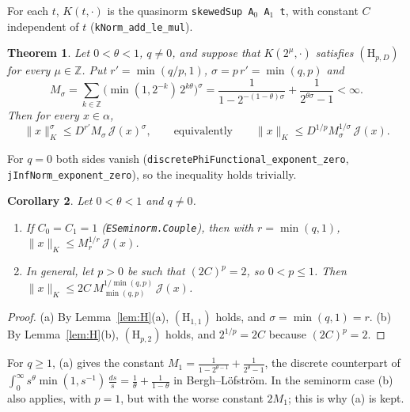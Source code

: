 \documentclass[11pt]{article}
\newtheorem{theorem}{Theorem}
\newtheorem{corollary}[theorem]{Corollary}
\theoremstyle{definition}
\theoremstyle{remark}
\newcommand{\norm}[2]{\lVert #1\rVert_{#2}}
\newcommand{\cJ}{\mathcal J}
\newcommand{\Z}{\mathbb Z}
\begin{document}
For each \(t\), \(K(t,\cdot)\) is the quasinorm \texttt{skewedSup A\(_0\) A\(_1\) t}, with
constant \(C\) independent of \(t\) (\texttt{kNorm\_add\_le\_mul}).

\begin{theorem}\label{thm:main}
  Let \(0 < \theta < 1\), \(q \ne 0\), and suppose that \(K(2^\mu,\cdot)\) satisfies
  \((\mathrm H_{p,D})\) for every \(\mu \in \Z\). Put \(r' = \min(q/p, 1)\),
  \(\sigma = p\,r' = \min(q,p)\) and
  \[
    M_\sigma = \sum_{k \in \Z}\bigl(\min(1,2^{-k})\,2^{k\theta}\bigr)^\sigma
    = \frac{1}{1 - 2^{-(1-\theta)\sigma}} + \frac{1}{2^{\theta\sigma} - 1} < \infty .
  \]
  Then for every \(x \in \alpha\),
  \[
    \norm{x}{K}^{\sigma} \le D^{r'} M_\sigma\, \cJ(x)^{\sigma},
    \qquad\text{equivalently}\qquad
    \norm{x}{K} \le D^{1/p} M_\sigma^{1/\sigma}\, \cJ(x).
  \]
\end{theorem}

For \(q = 0\) both sides vanish (\texttt{discretePhiFunctional\_exponent\_zero},
\texttt{jInfNorm\_exponent\_zero}), so the inequality holds trivially.

\begin{corollary}\label{cor:instances}
  Let \(0 < \theta < 1\) and \(q \ne 0\).
  \begin{enumerate}
    \item[(a)] If \(C_0 = C_1 = 1\) (\texttt{ESeminorm.Couple}), then with
      \(r = \min(q,1)\), \(\norm{x}{K} \le M_r^{1/r}\,\cJ(x)\).
    \item[(b)] In general, let \(p > 0\) be such that \((2C)^p = 2\), so \(0 < p \le 1\). Then
      \(\norm{x}{K} \le 2C\, M_{\min(q,p)}^{1/\min(q,p)}\,\cJ(x)\).
  \end{enumerate}
\end{corollary}

\begin{proof}
  (a) By Lemma~\ref{lem:H}(a), \((\mathrm H_{1,1})\) holds, and \(\sigma = \min(q,1) = r\).
  (b) By Lemma~\ref{lem:H}(b), \((\mathrm H_{p,2})\) holds, and \(2^{1/p} = 2C\) because
  \((2C)^p = 2\).
\end{proof}

For \(q \ge 1\), (a) gives the constant \(M_1 = \frac{1}{1-2^{\theta-1}} + \frac{1}{2^\theta - 1}\),
the discrete counterpart of
\(\int_0^\infty s^{\theta}\min(1,s^{-1})\,\frac{ds}{s} = \frac1\theta + \frac1{1-\theta}\) in
Bergh--L\"ofstr\"om. In the seminorm case (b) also applies, with \(p = 1\), but with the worse
constant \(2M_1\); this is why (a) is kept.
\end{document}
